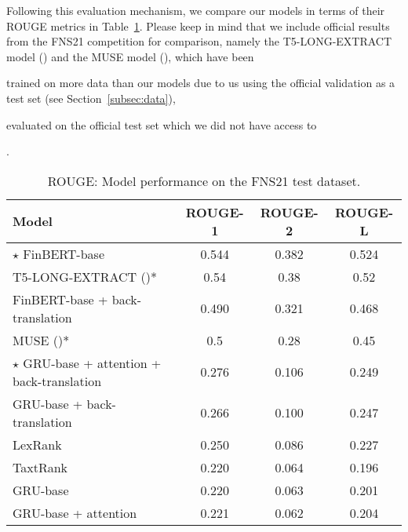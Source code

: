 Following this evaluation mechanism, we compare our models in terms of their ROUGE metrics in Table~\ref{tab:rouge_performance}.
Please keep in mind that we include official results from the FNS21 competition for comparison, namely the T5-LONG-EXTRACT model
(\cite{orzhenovskii-2021-t5}) and the MUSE model (\cite{litvak-last-2013-multilingual}), which have been
\begin{enumerate*}
    \item trained on more data than our models due to us using the official validation as a test set (see Section~\ref{subsec:data}),
    \item evaluated on the official test set which we did not have access to
\end{enumerate*}.

\begin{table}[ht]
    \centering
    \begin{tabular}{lccc}
        \toprule
        \textbf{Model} & \textbf{ROUGE-1} & \textbf{ROUGE-2} & \textbf{ROUGE-L} \\
        \midrule
            $\star$ FinBERT-base & 0.544 & 0.382 & 0.524 \\
            T5-LONG-EXTRACT (\cite{orzhenovskii-2021-t5})* & 0.54 & 0.38 & 0.52 \\
            FinBERT-base + back-translation & 0.490 & 0.321 & 0.468 \\
            MUSE (\cite{litvak-last-2013-multilingual})* & 0.5 & 0.28 & 0.45 \\
            $\star$ GRU-base + attention + back-translation & 0.276 & 0.106 & 0.249 \\
            GRU-base + back-translation & 0.266 & 0.100 & 0.247 \\
            LexRank & 0.250 & 0.086 & 0.227 \\
            TaxtRank & 0.220 & 0.064 & 0.196 \\
            GRU-base & 0.220 & 0.063 & 0.201 \\
            GRU-base + attention & 0.221 & 0.062 & 0.204 \\
        \bottomrule
    \end{tabular}\caption{ROUGE: Model performance on the FNS21 test dataset.}
    \label{tab:rouge_performance}
\end{table}

